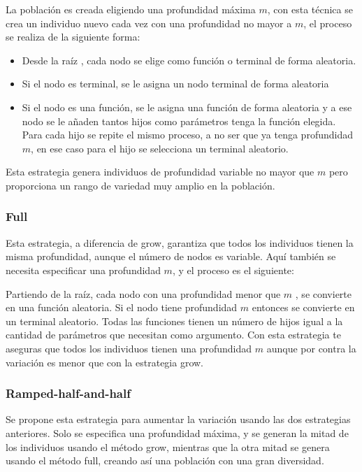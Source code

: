 \documentclass[12pt]{article} \usepackage[utf8]{inputenc}
\begin{document}
La población es creada eligiendo una profundidad máxima \(m\),
con esta técnica se crea un individuo nuevo cada vez con una
profundidad no mayor a \(m\),
el proceso se realiza de la siguiente forma:
\begin{itemize}
\item Desde la raíz , cada nodo se elige como función o terminal de
  forma aleatoria.
\item Si el nodo es terminal, se le asigna un nodo terminal de forma
  aleatoria
\item Si el nodo es una función, se le asigna una función de forma
  aleatoria y a ese nodo se le añaden tantos hijos como parámetros
  tenga la función elegida. Para cada hijo se repite el mismo proceso,
  a no ser que ya tenga profundidad \(m\),
  en ese caso para el hijo se selecciona un terminal aleatorio.
\end{itemize}

Esta estrategia genera individuos de profundidad variable no mayor que
\(m\) pero proporciona un rango de variedad muy amplio en la población.

\subsubsection{Full}

Esta estrategia, a diferencia de grow, garantiza que todos los
individuos tienen la misma profundidad, aunque el número de nodos es
variable. Aquí también se necesita especificar una profundidad \(m\),
y el proceso es el siguiente:

Partiendo de la raíz, cada nodo con una profundidad menor que \(m\)
, se convierte en una función aleatoria. Si el nodo tiene profundidad
\(m\) entonces se convierte en un terminal aleatorio. Todas las funciones
tienen un número de hijos igual a la cantidad de parámetros que necesitan
como argumento. Con esta estrategia te aseguras que todos los individuos
tienen una profundidad \(m\) aunque por contra la variación es menor
que con la estrategia grow.\\

\subsubsection{Ramped-half-and-half}

Se propone esta estrategia para aumentar la variación usando las dos
estrategias anteriores. Solo se especifica una profundidad máxima, y
se generan la mitad de los individuos usando el método grow, mientras
que la otra mitad se genera usando el método full, creando así una
población con una gran diversidad.
\end{document}
